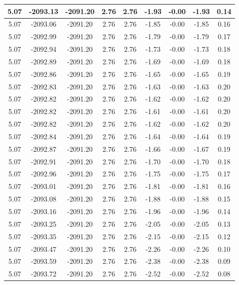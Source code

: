\begin{table}[htbp]
\begin{adjustbox}{angle=90}
\begin{tabular}{|c|c|c|c|c|c|c|c|c|}
 5.07 & -2093.13 & -2091.20 & 2.76 & 2.76 & -1.93 & -0.00 & -1.93 & 0.14\\ \hline
 5.07 & -2093.06 & -2091.20 & 2.76 & 2.76 & -1.85 & -0.00 & -1.85 & 0.16\\ \hline
 5.07 & -2092.99 & -2091.20 & 2.76 & 2.76 & -1.79 & -0.00 & -1.79 & 0.17\\ \hline
 5.07 & -2092.94 & -2091.20 & 2.76 & 2.76 & -1.73 & -0.00 & -1.73 & 0.18\\ \hline
 5.07 & -2092.89 & -2091.20 & 2.76 & 2.76 & -1.69 & -0.00 & -1.69 & 0.18\\ \hline
 5.07 & -2092.86 & -2091.20 & 2.76 & 2.76 & -1.65 & -0.00 & -1.65 & 0.19\\ \hline
 5.07 & -2092.83 & -2091.20 & 2.76 & 2.76 & -1.63 & -0.00 & -1.63 & 0.20\\ \hline
 5.07 & -2092.82 & -2091.20 & 2.76 & 2.76 & -1.62 & -0.00 & -1.62 & 0.20\\ \hline
 5.07 & -2092.82 & -2091.20 & 2.76 & 2.76 & -1.61 & -0.00 & -1.61 & 0.20\\ \hline
 5.07 & -2092.82 & -2091.20 & 2.76 & 2.76 & -1.62 & -0.00 & -1.62 & 0.20\\ \hline
 5.07 & -2092.84 & -2091.20 & 2.76 & 2.76 & -1.64 & -0.00 & -1.64 & 0.19\\ \hline
 5.07 & -2092.87 & -2091.20 & 2.76 & 2.76 & -1.66 & -0.00 & -1.67 & 0.19\\ \hline
 5.07 & -2092.91 & -2091.20 & 2.76 & 2.76 & -1.70 & -0.00 & -1.70 & 0.18\\ \hline
 5.07 & -2092.96 & -2091.20 & 2.76 & 2.76 & -1.75 & -0.00 & -1.75 & 0.17\\ \hline
 5.07 & -2093.01 & -2091.20 & 2.76 & 2.76 & -1.81 & -0.00 & -1.81 & 0.16\\ \hline
 5.07 & -2093.08 & -2091.20 & 2.76 & 2.76 & -1.88 & -0.00 & -1.88 & 0.15\\ \hline
 5.07 & -2093.16 & -2091.20 & 2.76 & 2.76 & -1.96 & -0.00 & -1.96 & 0.14\\ \hline
 5.07 & -2093.25 & -2091.20 & 2.76 & 2.76 & -2.05 & -0.00 & -2.05 & 0.13\\ \hline
 5.07 & -2093.35 & -2091.20 & 2.76 & 2.76 & -2.15 & -0.00 & -2.15 & 0.12\\ \hline
 5.07 & -2093.47 & -2091.20 & 2.76 & 2.76 & -2.26 & -0.00 & -2.26 & 0.10\\ \hline
 5.07 & -2093.59 & -2091.20 & 2.76 & 2.76 & -2.38 & -0.00 & -2.38 & 0.09\\ \hline
 5.07 & -2093.72 & -2091.20 & 2.76 & 2.76 & -2.52 & -0.00 & -2.52 & 0.08\\ \hline

\end{tabular}
\end{adjustbox}
\end{table}
